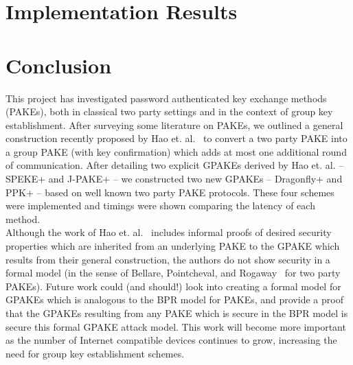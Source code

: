 \documentclass{amsart}
\theoremstyle{remark}
\begin{document}

\section{Implementation Results}
\label{sec:Implementation}

\vspace{0.3in}


\section{Conclusion}
\label{sec:Conclusion}
This project has investigated password authenticated key exchange methods (PAKEs), both in classical two party settings
and in the context of group key establishment.  After surveying some literature on PAKEs, we outlined a general construction
recently proposed by Hao et. al.~\cite{HaYiChSh15} to convert a two party PAKE into a group PAKE (with key confirmation) 
which adds at most one additional round of communication.  After detailing two explicit GPAKEs derived by Hao et. al. -- 
SPEKE+ and J-PAKE+ -- we constructed two new GPAKEs -- Dragonfly+ and PPK+ -- based on well known two party PAKE protocols.
These four schemes were implemented and timings were shown comparing the latency of each method.
\\

Although the work of Hao et. al.~\cite{HaYiChSh15} includes informal proofs of desired security properties which are inherited
from an underlying PAKE to the GPAKE which results from their general construction, the authors do not show security in a formal
model (in the sense of Bellare, Pointcheval, and Rogaway~\cite{BePoRo00} for two party PAKEs).  Future work could (and should!) look 
into creating a formal model for GPAKEs which is analogous to the BPR model for PAKEs, and provide a proof that the GPAKEs resulting
from any PAKE which is secure in the BPR model is secure this formal GPAKE attack model.  This work will become more important as
the number of Internet compatible devices continues to grow, increasing the need for group key establishment schemes.




\nocite{*}


\end{document}
